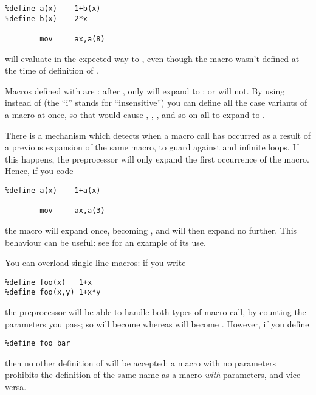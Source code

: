 \begin{lstlisting}
%define a(x)    1+b(x)
%define b(x)    2*x

        mov     ax,a(8)
\end{lstlisting}

will evaluate in the expected way to , even though
the macro  wasn't defined at the time of definition of .

Macros defined with  are : after
, only  will expand to :
 or  will not. By using  instead of
 (the ``i'' stands for ``insensitive'') you can define
all the case variants of a macro at once, so that 
would cause , , ,  and so on
all to expand to .

There is a mechanism which detects when a macro call has occurred as
a result of a previous expansion of the same macro, to guard against
 and infinite loops. If this happens,
the preprocessor will only expand the first occurrence of the macro.
Hence, if you code

\begin{lstlisting}
%define a(x)    1+a(x)

        mov     ax,a(3)
\end{lstlisting}

the macro  will expand once, becoming , and will
then expand no further. This behaviour can be useful: see 
for an example of its use.

You can overload single-line
macros: if you write

\begin{lstlisting}
%define foo(x)   1+x
%define foo(x,y) 1+x*y
\end{lstlisting}

the preprocessor will be able to handle both types of macro call,
by counting the parameters you pass; so  will become
 whereas  will become .
However, if you define

\begin{lstlisting}
%define foo bar
\end{lstlisting}

then no other definition of  will be accepted: a macro with
no parameters prohibits the definition of the same name as a macro
\emph{with} parameters, and vice versa.

